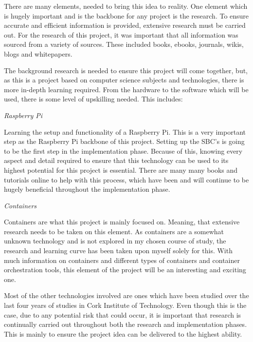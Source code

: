 There are many elements, needed to bring this idea to reality. One element which is hugely important and is the backbone for any project is the research. To ensure accurate and efficient information is provided, extensive research must be carried out. For the research of this project, it was important that all information was sourced from a variety of sources. These included books, ebooks, journals, wikis, blogs and whitepapers. 

The background research is needed to ensure this project will come together, but, as this is a project based on computer science subjects and technologies, there is more in-depth learning required. From the hardware to the software which will be used, there is some level of upskilling needed. This includes:

\textit{Raspberry Pi}

Learning the setup and functionality of a Raspberry Pi. This is a very important step as the Raspberry Pi backbone of this project. Setting up the SBC's is going to be the first step in the implementation phase. Because of this, knowing every aspect and detail required to ensure that this technology can be used to its highest potential for this project is essential. There are many many books and tutorials online to help with this process, which have been and will continue to be hugely beneficial throughout the implementation phase. 

\textit{Containers}

Containers are what this project is mainly focused on. Meaning, that extensive research needs to be taken on this element. As containers are a somewhat unknown technology and is not explored in my chosen course of study, the research and learning curve has been taken upon myself solely for this. With much information on containers and different types of containers and container orchestration tools, this element of the project will be an interesting and exciting one. 


Most of the other technologies involved are ones which have been studied over the last four years of studies in Cork Institute of Technology. Even though this is the case, due to any potential risk that could occur, it is important that research is continually carried out throughout both the research and implementation phases. This is mainly to ensure the project idea can be delivered to the highest ability. 


